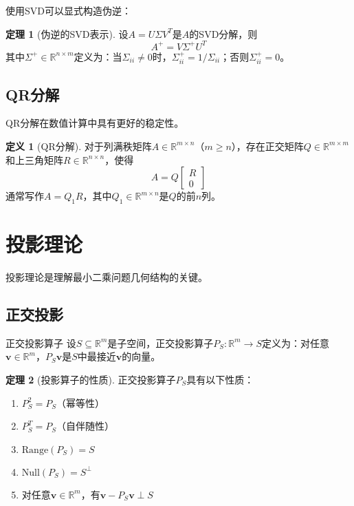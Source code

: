 \documentclass[11pt,a4paper]{ctexart}
\theoremstyle{definition}
\newtheorem{definition}{定义}[section]
\newtheorem{theorem}{定理}[section]
\newcommand{\RR}{\mathbb{R}}
\newcommand{\Range}{\text{Range}}
\newcommand{\Null}{\text{Null}}
\begin{document}
使用SVD可以显式构造伪逆：

\begin{theorem}[伪逆的SVD表示]
设$A = U\Sigma V^T$是$A$的SVD分解，则
$$A^+ = V\Sigma^+ U^T$$
其中$\Sigma^+ \in \RR^{n \times m}$定义为：当$\Sigma_{ii} \neq 0$时，$\Sigma^+_{ii} = 1/\Sigma_{ii}$；否则$\Sigma^+_{ii} = 0$。
\end{theorem}

\subsection{QR分解}

QR分解在数值计算中具有更好的稳定性。

\begin{definition}[QR分解]
对于列满秩矩阵$A \in \RR^{m \times n}$（$m \geq n$），存在正交矩阵$Q \in \RR^{m \times m}$和上三角矩阵$R \in \RR^{n \times n}$，使得
$$A = Q\begin{bmatrix} R \\ 0 \end{bmatrix}$$
通常写作$A = Q_1R$，其中$Q_1 \in \RR^{m \times n}$是$Q$的前$n$列。
\end{definition}

\section{投影理论}

投影理论是理解最小二乘问题几何结构的关键。

\subsection{正交投影}

\begin{importantdef}{正交投影算子}
设$S \subseteq \RR^m$是子空间，正交投影算子$P_S: \RR^m \to S$定义为：对任意$\boldsymbol{v} \in \RR^m$，$P_S\boldsymbol{v}$是$S$中最接近$\boldsymbol{v}$的向量。
\end{importantdef}

\begin{theorem}[投影算子的性质]
正交投影算子$P_S$具有以下性质：
\begin{enumerate}[label=(\roman*)]
\item $P_S^2 = P_S$（幂等性）
\item $P_S^T = P_S$（自伴随性）
\item $\Range(P_S) = S$
\item $\Null(P_S) = S^\perp$
\item 对任意$\boldsymbol{v} \in \RR^m$，有$\boldsymbol{v} - P_S\boldsymbol{v} \perp S$
\end{enumerate}
\end{theorem}
\end{document}
